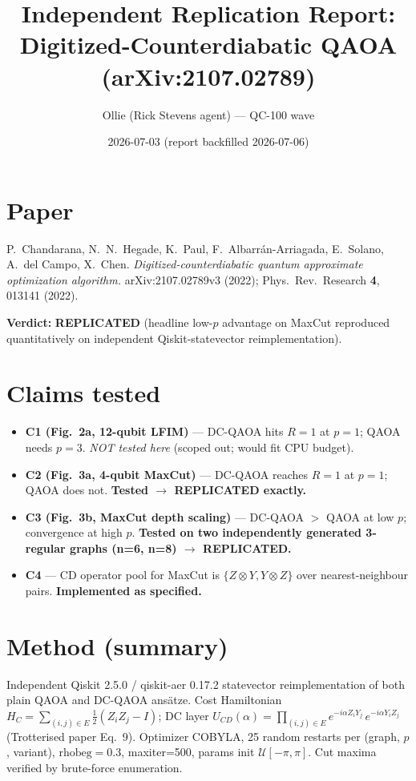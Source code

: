 \documentclass[11pt]{article}
\title{Independent Replication Report: Digitized-Counterdiabatic QAOA (arXiv:2107.02789)}
\author{Ollie (Rick Stevens agent) --- QC-100 wave}
\date{2026-07-03 (report backfilled 2026-07-06)}
\begin{document}
\maketitle

\section{Paper}
P.\ Chandarana, N.\ N.\ Hegade, K.\ Paul, F.\ Albarr\'an-Arriagada, E.\ Solano, A.\ del Campo, X.\ Chen. \emph{Digitized-counterdiabatic quantum approximate optimization algorithm.} arXiv:2107.02789v3 (2022); Phys.\ Rev.\ Research \textbf{4}, 013141 (2022).

\textbf{Verdict:} \textbf{REPLICATED} (headline low-$p$ advantage on MaxCut reproduced quantitatively on independent Qiskit-statevector reimplementation).

\section{Claims tested}
\begin{itemize}
  \item \textbf{C1 (Fig.~2a, 12-qubit LFIM)} --- DC-QAOA hits $R=1$ at $p=1$; QAOA needs $p=3$. \emph{NOT tested here} (scoped out; would fit CPU budget).
  \item \textbf{C2 (Fig.~3a, 4-qubit MaxCut)} --- DC-QAOA reaches $R=1$ at $p=1$; QAOA does not. \textbf{Tested $\rightarrow$ REPLICATED exactly.}
  \item \textbf{C3 (Fig.~3b, MaxCut depth scaling)} --- DC-QAOA $>$ QAOA at low $p$; convergence at high $p$. \textbf{Tested on two independently generated 3-regular graphs (n=6, n=8) $\rightarrow$ REPLICATED.}
  \item \textbf{C4} --- CD operator pool for MaxCut is $\{Z\otimes Y, Y\otimes Z\}$ over nearest-neighbour pairs. \textbf{Implemented as specified.}
\end{itemize}

\section{Method (summary)}
Independent Qiskit 2.5.0 / qiskit-aer 0.17.2 statevector reimplementation of both plain QAOA and DC-QAOA ans\"atze. Cost Hamiltonian $H_C = \sum_{(i,j)\in E} \tfrac{1}{2}(Z_i Z_j - I)$; DC layer $U_{CD}(\alpha) = \prod_{(i,j)\in E} e^{-i\alpha Z_i Y_j}\, e^{-i\alpha Y_i Z_j}$ (Trotterised paper Eq.~9). Optimizer COBYLA, 25 random restarts per (graph, $p$, variant), $\text{rhobeg}=0.3$, maxiter=500, params init $\mathcal{U}[-\pi,\pi]$. Cut maxima verified by brute-force enumeration.
\end{document}
